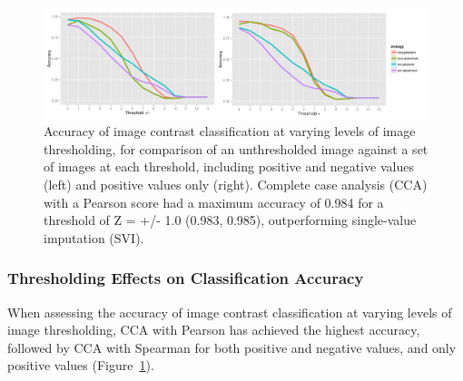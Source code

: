 \documentclass{report}
\begin{document}
\begin{figure}[h!]
\begin{center}
\includegraphics[width=15cm]{images/figure23.png}
\end{center}
 \caption{\label{fig:23} Accuracy of image contrast classification at varying levels of image thresholding, for comparison of an unthresholded image against a set of images at each threshold, including positive and negative values (left) and positive values only (right). Complete case analysis (CCA) with a Pearson score had a maximum accuracy of 0.984 for a threshold of Z = +/- 1.0 (0.983, 0.985), outperforming single-value imputation (SVI).}
\end{figure}

\subsubsection{Thresholding Effects on Classification Accuracy}

When assessing the accuracy of image contrast classification at varying
levels of image thresholding, CCA with Pearson has achieved the highest
accuracy, followed by CCA with Spearman for both positive and negative
values, and only positive values (Figure~\ref{fig:23}).
\end{document}
